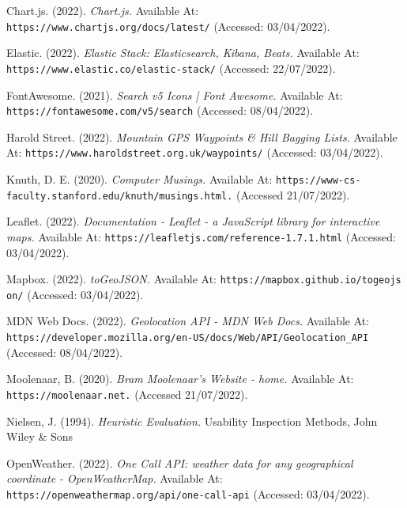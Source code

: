\documentclass[11pt, english]{article}
\begin{document}
\newpage

	\renewcommand\refname{Bibliography}

	\fancyhead[L]{\leftmark}

	\begin{thebibliography}{9}

	\bibitem{}
		Chart.js. (2022).
		\textsl{Chart.js.}
		Available At:
		\texttt{https://www.chartjs.org/docs/latest/}
		(Accessed: 03/04/2022).

	\bibitem{}
		Elastic. (2022).
		\textsl{Elastic Stack: Elasticsearch, Kibana, Beats.}
		Available At:
		\texttt{https://www.elastic.co/elastic-stack/}
		(Accessed: 22/07/2022).

	\bibitem{}
		FontAwesome. (2021).
		\textsl{Search v5 Icons | Font Awesome.}
		Available At:
		\texttt{https://fontawesome.com/v5/search}
		(Accessed: 08/04/2022).

	\bibitem{}
		Harold Street. (2022).
		\textsl{Mountain GPS Waypoints \& Hill Bagging Lists.}
		Available At:
		\texttt{https://www.haroldstreet.org.uk/waypoints/}
		(Accessed: 03/04/2022).

	\bibitem{}
		Knuth, D. E. (2020).
		\textsl{Computer Musings.}
		Available At:
		\texttt{https://www-cs-faculty.stanford.edu/knuth/musings.html.}
		(Accessed 21/07/2022).

	\bibitem{}
		Leaflet. (2022).
		\textsl{Documentation - Leaflet - a JavaScript library for interactive maps.}
		Available At:
		\texttt{https://leafletjs.com/reference-1.7.1.html}
		(Accessed: 03/04/2022).

	\bibitem{}
		Mapbox. (2022).
		\textsl{toGeoJSON.}
		Available At:
		\texttt{https://mapbox.github.io/togeojs on/}
		(Accessed: 03/04/2022).

	\bibitem{}
		MDN Web Docs. (2022).
		\textsl{Geolocation API - MDN Web Docs.}
		Available At:
		\texttt{https://developer.mozilla.org/en-US/docs/Web/API/Geolocation\_API}
		(Accessed: 08/04/2022).

	\bibitem{}
		Moolenaar, B. (2020).
		\textsl{Bram Moolenaar's Website - home.}
		Available At:
		\texttt{https://moolenaar.net.}
		(Accessed 21/07/2022).

	\bibitem{}
		Nielsen, J. (1994).
		\textsl{Heuristic Evaluation.}
		Usability Inspection Methods, John Wiley \& Sons

	\bibitem{}
		OpenWeather. (2022).
		\textsl{One Call API: weather data for any geographical coordinate - OpenWeatherMap.}
		Available At:
		\texttt{https://openweathermap.org/api/one-call-api}
		(Accessed: 03/04/2022).


\end{thebibliography}
\end{document}
